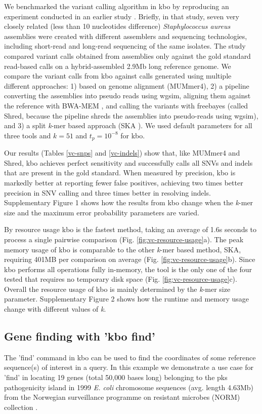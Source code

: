 \documentclass[unnumsec,webpdf,modern,large]{biorxiv}%
\theoremstyle{thmstyleone}%
\theoremstyle{thmstyletwo}%
\theoremstyle{thmstylethree}%
\begin{document}
We benchmarked the variant calling algorithm in {\sf kbo} by reproducing an experiment conducted in an earlier study \cite{wick2025reads}. Briefly, in that study, seven very closely related (less than 10 nucleotides difference) \textit{Staphylococcus aureus} assemblies were created with different assemblers and sequencing technologies, including short-read and long-read sequencing of the same isolates. The study compared variant calls obtained from assemblies only against the gold standard read-based calls on a hybrid-assembled 2.9Mb long reference genome. We compare the variant calls from {\sf kbo} against calls generated using multiple different approaches: 1) based on genome alignment (MUMmer4\cite{marccais2018mummer4}), 2) a pipeline converting the assemblies into pseudo reads using wgsim, aligning them against the reference with BWA-MEM \cite{li2013aligning}, and calling the variants with freebayes \cite{garrison2012haplotype} (called Shred, because the pipeline shreds the assemblies into pseudo-reads using wgsim), and 3) a split \emph{k}-mer based approach (SKA \cite{derelle2024seamless}). We used default parameters for all three tools and $k = 51$ and $t_p = 10^{-8}$ for {\sf kbo}.

Our results (Tables \ref{vc-snps} and \ref{vc-indels}) show that, like MUMmer4 and Shred, {\sf kbo} achieves perfect sensitivity and successfully calls all SNVs and indels that are present in the gold standard. When measured by precision, {\sf kbo} is markedly better at reporting fewer false positives, achieving two times better precision in SNV calling and three times better in resolving indels. Supplementary Figure 1 shows how the results from {\sf kbo} change when the \emph{k}-mer size and the maximum error probability parameters are varied.

By resource usage {\sf kbo} is the fastest method, taking an average of 1.6s seconds to process a single pairwise comparison (Fig. \ref{fig:vc-resource-usage}a). The peak memory usage of {\sf kbo} is comparable to the other \emph{k}-mer based method, SKA, requiring 401MB per comparison on average (Fig. \ref{fig:vc-resource-usage}b). Since {\sf kbo} performs all operations fully in-memory, the tool is the only one of the four tested that requires no temporary disk space (Fig. \ref{fig:vc-resource-usage}c). Overall the resource usage of {\sf kbo} is mainly determined by the \emph{k}-mer size parameter. Supplementary Figure 2 shows how the runtime and memory usage change with different values of \emph{k}.

\subsection{Gene finding with 'kbo find'}
The 'find' command in {\sf kbo} can be used to find the coordinates of some reference sequence(s) of interest in a query. In this example we demonstrate a use case for 'find' in locating 19 genes (total 50,000 bases long) belonging to the pks pathogenicity island in 1999 \textit{E. coli} chromosome sequences (avg. length 4.63Mb) from the Norwegian surveillance programme on resistant microbes (NORM) collection \cite{gladstone2021emergence, arredondo2023escherichia}.
\end{document}
